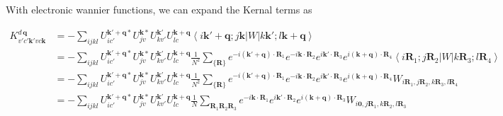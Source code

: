 \documentclass{report}
\begin{document}
With electronic wannier functions, we can expand the Kernal terms as

\begin{equation}
  \begin{aligned}
    K_{v'c'\boldsymbol{k}'vc\boldsymbol{k}}^{d\,\boldsymbol{q}} 
      &= - \sum_{ijkl} U_{ic'}^{\boldsymbol{k}'+\boldsymbol{q}*} U_{jv}^{\boldsymbol{k}*} 
        U_{kv'}^{\boldsymbol{k}'} U_{lc}^{\boldsymbol{k}+\boldsymbol{q}} 
        \left\langle i\boldsymbol{k}'+\boldsymbol{q};j\boldsymbol{k} \left| W \right| k\boldsymbol{k}';l\boldsymbol{k}+\boldsymbol{q} \right\rangle \\
      &= - \sum_{ijkl} U_{ic'}^{\boldsymbol{k}'+\boldsymbol{q}*} U_{jv}^{\boldsymbol{k}*} 
        U_{kv'}^{\boldsymbol{k}'} U_{lc}^{\boldsymbol{k}+\boldsymbol{q}} 
        \frac{1}{N^2} \sum_{\{\boldsymbol{R}\}} 
        e^{-i(\boldsymbol{k}'+\boldsymbol{q}) \cdot \boldsymbol{R}_1} 
        e^{-i\boldsymbol{k} \cdot \boldsymbol{R}_2} 
        e^{i\boldsymbol{k}' \cdot \boldsymbol{R}_3} 
        e^{i(\boldsymbol{k}+\boldsymbol{q}) \cdot \boldsymbol{R}_4} 
        \left\langle i\boldsymbol{R}_1;j\boldsymbol{R}_2 \left| W \right| k\boldsymbol{R}_3;l\boldsymbol{R}_4 \right\rangle \\
      &= - \sum_{ijkl} U_{ic'}^{\boldsymbol{k}'+\boldsymbol{q}*} U_{jv}^{\boldsymbol{k}*} U_{kv'}^{\boldsymbol{k}'} U_{lc}^{\boldsymbol{k}+\boldsymbol{q}} 
        \frac{1}{N^2} \sum_{\{\boldsymbol{R}\}} 
        e^{-i(\boldsymbol{k}'+\boldsymbol{q}) \cdot \boldsymbol{R}_1} 
        e^{-i\boldsymbol{k} \cdot \boldsymbol{R}_2} 
        e^{i\boldsymbol{k}' \cdot \boldsymbol{R}_3} 
        e^{i(\boldsymbol{k}+\boldsymbol{q}) \cdot \boldsymbol{R}_4} 
        W_{i\boldsymbol{R}_1,j\boldsymbol{R}_2,k\boldsymbol{R}_3,l\boldsymbol{R}_4} \\
      &= - \sum_{ijkl} U_{ic'}^{\boldsymbol{k}'+\boldsymbol{q}*} U_{jv}^{\boldsymbol{k}*} U_{kv'}^{\boldsymbol{k}'} U_{lc}^{\boldsymbol{k}+\boldsymbol{q}} 
        \frac{1}{N} \sum_{\boldsymbol{R}_1\boldsymbol{R}_2\boldsymbol{R}_3} 
        e^{-i\boldsymbol{k} \cdot \boldsymbol{R}_1} 
        e^{i\boldsymbol{k}' \cdot \boldsymbol{R}_2} 
        e^{i(\boldsymbol{k}+\boldsymbol{q}) \cdot \boldsymbol{R}_3} 
        W_{i\boldsymbol{0},j\boldsymbol{R}_1,k\boldsymbol{R}_2,l\boldsymbol{R}_3} \\
  \end{aligned}
\end{equation}
\end{document}
